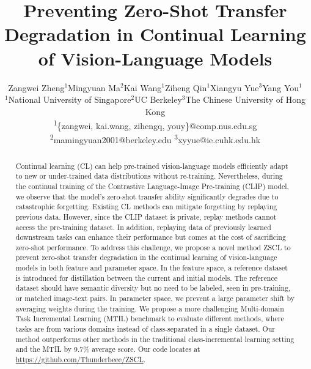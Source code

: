 \documentclass[10pt,twocolumn,letterpaper]{article}
\begin{document}
\title{Preventing Zero-Shot Transfer Degradation in Continual Learning of Vision-Language Models}

\author{
Zangwei Zheng$^{1}$\quad Mingyuan Ma$^{2}$\quad Kai Wang$^{1}$\quad Ziheng Qin$^{1}$\quad Xiangyu Yue$^{3}$\quad Yang You$^{1}$
\vspace{1mm}
\\
$^1$National University of Singapore\quad $^2$UC Berkeley\quad $^3$The Chinese University of Hong Kong
\vspace{2mm}
\\ 
{\normalsize \textsuperscript{\rm 1}\{zangwei, kai.wang, zihengq, youy\}@comp.nus.edu.sg}
{\normalsize \textsuperscript{\rm 2}mamingyuan2001@berkeley.edu}
{\normalsize \textsuperscript{\rm 3}xyyue@ie.cuhk.edu.hk}
}

\maketitle
\ificcvfinal\thispagestyle{empty}\fi


\begin{abstract}
Continual learning (CL) can help pre-trained vision-language models efficiently adapt to new or under-trained data distributions without re-training. Nevertheless, during the continual training of the Contrastive Language-Image Pre-training (CLIP) model, we observe that the model's zero-shot transfer ability significantly degrades due to catastrophic forgetting.
Existing CL methods can mitigate forgetting by replaying previous data. However, since the CLIP dataset is private, replay methods cannot access the pre-training dataset. In addition, replaying data of previously learned downstream tasks can enhance their performance but comes at the cost of sacrificing zero-shot performance.
To address this challenge, we propose a novel method ZSCL to prevent zero-shot transfer degradation in the continual learning of vision-language models in both feature and parameter space. 
In the feature space, a reference dataset is introduced for distillation between the current and initial models. The reference dataset should have semantic diversity but no need to be labeled, seen in pre-training, or matched image-text pairs. 
In parameter space, we prevent a large parameter shift by averaging weights during the training.
We propose a more challenging Multi-domain Task Incremental Learning (MTIL) benchmark to evaluate different methods, where tasks are from various domains instead of class-separated in a single dataset. Our method outperforms other methods in the traditional class-incremental learning setting and the MTIL by 9.7\% average score. Our code locates at \url{https://github.com/Thunderbeee/ZSCL}.
\end{abstract}
\end{document}
